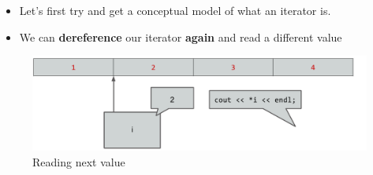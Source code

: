 \documentclass{beamer}
\newtheorem{Key points}{Key points}
\begin{document}
\begin{frame}
  \begin{itemize}
  \item  Let's first try and get a conceptual model of
what an iterator is.
\item  We can \textbf{dereference} our iterator \textbf{again} and
read a different value
  \end{itemize}
  \begin{figure}
    \centering
         \includegraphics[width=0.9\columnwidth]{itr6.png} 
    \caption{Reading next value}
  \end{figure}
\end{frame}
\end{document}
